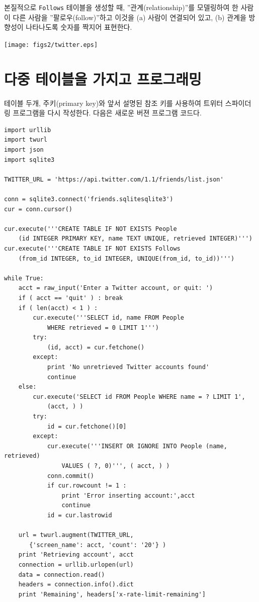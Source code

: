 본질적으로 {\tt Follows} 테이블을 생성할 때, ''관계(relationship)''를 모델링하여 한 사람이 다른 사람을 ''팔로우(follow)''하고
이것을 (a) 사람이 연결되어 있고, (b) 관계을 방향성이 나타나도록 숫자를 짝지어 표현한다.  

\beforefig
\centerline{\texttt{[image: figs2/twitter.eps]}}
\afterfig

\section{다중 테이블을 가지고 프로그래밍}
테이블 두개, 주키(primary key)와 앞서 설명된 참조 키를 사용하여 트위터 스파이더링 프로그램을 다시 작성한다.
다음은 새로운 버젼 프로그램 코드다.

\beforeverb
\begin{verbatim}
import urllib
import twurl
import json
import sqlite3

TWITTER_URL = 'https://api.twitter.com/1.1/friends/list.json'

conn = sqlite3.connect('friends.sqlitesqlite3')
cur = conn.cursor()

cur.execute('''CREATE TABLE IF NOT EXISTS People 
    (id INTEGER PRIMARY KEY, name TEXT UNIQUE, retrieved INTEGER)''')
cur.execute('''CREATE TABLE IF NOT EXISTS Follows 
    (from_id INTEGER, to_id INTEGER, UNIQUE(from_id, to_id))''')

while True:
    acct = raw_input('Enter a Twitter account, or quit: ')
    if ( acct == 'quit' ) : break
    if ( len(acct) < 1 ) :
        cur.execute('''SELECT id, name FROM People 
            WHERE retrieved = 0 LIMIT 1''')
        try:
            (id, acct) = cur.fetchone()
        except:
            print 'No unretrieved Twitter accounts found'
            continue
    else:
        cur.execute('SELECT id FROM People WHERE name = ? LIMIT 1', 
            (acct, ) )
        try:
            id = cur.fetchone()[0]
        except:
            cur.execute('''INSERT OR IGNORE INTO People (name, retrieved) 
                VALUES ( ?, 0)''', ( acct, ) )
            conn.commit()
            if cur.rowcount != 1 : 
                print 'Error inserting account:',acct
                continue
            id = cur.lastrowid

    url = twurl.augment(TWITTER_URL, 
       {'screen_name': acct, 'count': '20'} )
    print 'Retrieving account', acct
    connection = urllib.urlopen(url)
    data = connection.read()
    headers = connection.info().dict
    print 'Remaining', headers['x-rate-limit-remaining']


\end{verbatim}
